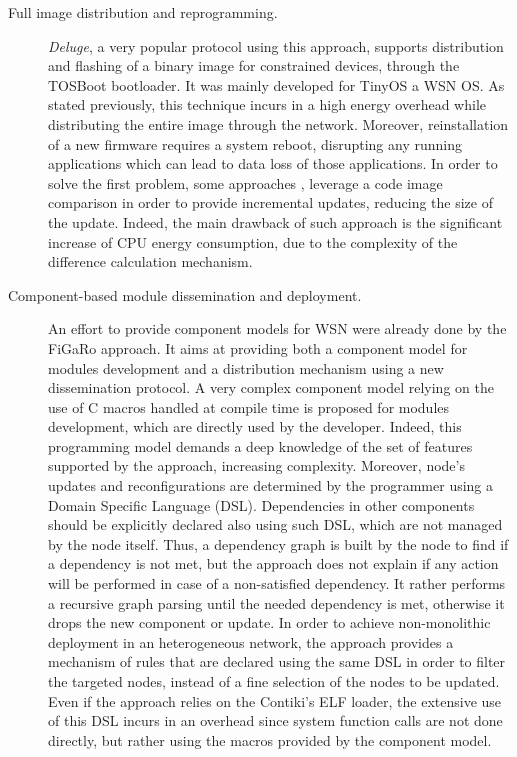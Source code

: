 \begin{description}
	\item[Full image distribution and reprogramming.] \textit{Deluge}\cite{hui2004dynamic}, a very popular protocol using this approach, supports distribution and flashing of a binary image for constrained devices, through the TOSBoot bootloader.
	It was mainly developed for TinyOS\cite{levis2005tinyos} a WSN OS.
	As stated previously, this technique incurs in a high energy overhead while distributing the entire image through the network.
	Moreover, reinstallation of a new firmware requires a system reboot, disrupting any running applications which can lead to data loss of those applications.
	In order to solve the first problem, some approaches \cite{jeong2004incremental}, \cite{reijers2003efficient} leverage a code image comparison in order to provide incremental updates, reducing the size of the update.
	Indeed, the main drawback of such approach is the significant increase of CPU energy consumption, due to the complexity of the difference calculation mechanism.
	
	\item[Component-based module dissemination and deployment.] An effort to provide component models for WSN were already done by the FiGaRo approach\cite{mottola2008figaro}.
	It aims at providing both a component model for modules development and a distribution mechanism using a new dissemination protocol.
	A very complex component model relying on the use of C macros handled at compile time is proposed for modules development, which are directly used by the developer.
	Indeed, this programming model demands a deep knowledge of the set of features supported by the approach, increasing complexity.
	Moreover, node's updates and reconfigurations are determined by the programmer using a Domain Specific Language (DSL).
	Dependencies in other components should be explicitly declared also using such DSL, which are not managed by the node itself.
	Thus, a dependency graph is built by the node to find if a dependency is not met, but the approach does not explain if any action will be performed in case of a non-satisfied dependency.
	It rather performs a recursive graph parsing until the needed dependency is met, otherwise it drops the new component or update.
	In order to achieve non-monolithic deployment in an heterogeneous network, the approach provides a mechanism of rules that are declared using the same DSL in order to filter the targeted nodes, instead of a fine selection of the nodes to be updated.
	Even if the approach relies on the Contiki's ELF loader, the extensive use of this DSL incurs in an overhead since system function calls are not done directly, but rather using the macros provided by the component model.
	

\end{description}
